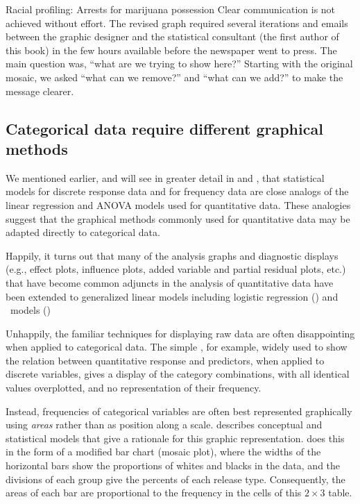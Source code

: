 \documentclass[10pt,krantz2]{krantz}\usepackage[]{graphicx}\usepackage[]{color}
\begin{document}
\begin{Example}[arrests0]{Racial profiling: Arrests for marijuana possession}
Clear communication is not achieved without effort.  The revised graph required several iterations
and emails between the graphic designer and the statistical consultant (the first author of this book)
in the few hours available before the newspaper went to press.
The main question was, ``what are we trying to show here?'' Starting with the original
 mosaic, we asked ``what can we remove?'' and ``what can we add?''
to make the message clearer.

\end{Example}


\subsection{Categorical data require different graphical methods}\label{sec:intro-catdata}

We mentioned earlier, and will see in greater detail
in  and ,
that statistical models for discrete
response data and for frequency
data are close analogs of the linear regression and ANOVA models
used for quantitative data.
These analogies suggest that the graphical methods
commonly used for quantitative data may be adapted directly to
categorical data.

Happily, it turns out that many of the analysis graphs and diagnostic
displays (e.g., effect plots,
influence plots, added variable and partial residual
plots, etc.)
that have become common adjuncts in the analysis of
quantitative data have been extended to generalized linear models
including logistic regression ()
and \loglin\ models ()

Unhappily, the familiar techniques for displaying raw data are
often disappointing when applied to categorical data.
The simple \scat, for example, widely used to show
the relation between
quantitative response and predictors, when applied to discrete
variables, gives a display of the category combinations,
with all identical values overplotted, and no representation of
their frequency.

Instead, frequencies of categorical variables are often best
represented graphically using \emph{areas} rather than as
position along a scale. \citet{Friendly:95} describes
conceptual and statistical models that give a rationale
for this graphic representation.
 does this in the form of a
modified bar chart (mosaic plot), where the widths of the horizontal
bars show the proportions of whites and blacks in the data, and
the divisions of each group give the percents of each release type.
Consequently, the areas of each bar are proportional to the
frequency in the cells of this $2 \times 3$ table.
\end{document}
